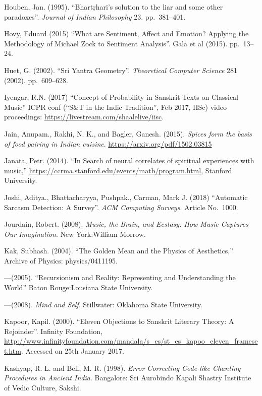 \begin{thebibliography}{99}
Houben, Jan. (1995). “Bhartṛhari's solution to the liar and some other paradoxes”. \textsl{Journal of Indian Philosophy} 23. pp.~381--401.

Hovy, Eduard (2015) “What are Sentiment, Affect and Emotion? Applying the Methodology of Michael Zock to Sentiment Analysis”. Gala et al (2015). pp.~13--24.

Huet, G. (2002). “Sri Yantra Geometry”. \textsl{Theoretical Computer Science} 281 (2002). pp.~609--628.

Iyengar, R.N. (2017) “Concept of Probability in Sanskrit Texts on Classical Music” ICPR conf (“S\&T in the Indic Tradition”, Feb 2017, IISc) video proceedings: \url{https://livestream.com/shaalelive/iisc}.

Jain, Anupam., Rakhi, N. K., and Bagler, Ganesh. (2015). \textsl{Spices form the basis of food pairing in Indian cuisine}. \url{https://arxiv.org/pdf/1502.03815}

Janata, Petr. (2014). “In Search of neural correlates of spiritual experiences with music,” \url{https://ccrma.stanford.edu/events/matb/program.html}, Stanford University.

Joshi, Aditya., Bhattacharyya, Pushpak., Carman, Mark J. (2018) “Automatic Sarcasm Detection: A Survey”. \textsl{ACM Computing Surveys}. Article No.~1000.

Jourdain, Robert. (2008). \textsl{Music, the Brain, and Ecstasy: How Music Captures Our Imagination}. New York:William Morrow.

Kak, Subhash. (2004). “The Golden Mean and the Physics of Aesthetics,” Archive of Physics: physics/0411195.

---\kern3pt(2005). “Recursionism and Reality: Representing and Understanding the World” Baton Rouge:Lousiana State University.

---\kern3pt(2008). \textsl{Mind and Self}. Stillwater: Oklahoma State University.

Kapoor, Kapil. (2000). “Eleven Objections to Sanskrit Literary Theory: A Rejoinder”. Infinity Foundation, \url{http://www.infinityfoundation.com/mandala/s_es/st_es_kapoo_eleven_frameset.htm}. Accessed on 25th January 2017.

Kashyap, R. L. and Bell, M. R. (1998). \textsl{Error Correcting Code-like Chanting Procedures in Ancient India}. Bangalore: Sri Aurobindo Kapali Shastry Institute of Vedic Culture, Sakshi.


\end{thebibliography}
